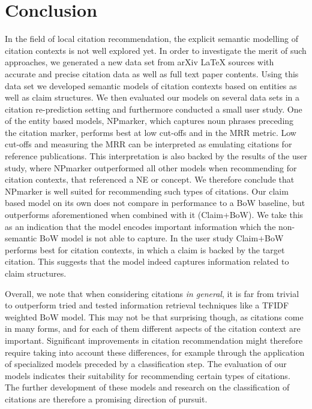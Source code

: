 \chapter{Conclusion}\label{chap:conclusion}
In the field of local citation recommendation, the explicit semantic modelling of citation contexts is not well explored yet. In order to investigate the merit of such approaches, we generated a new data set from arXiv \LaTeX{} sources with accurate and precise citation data as well as full text paper contents. Using this data set we developed semantic models of citation contexts based on entities as well as claim structures. We then evaluated our models on several data sets in a citation re-prediction setting and furthermore conducted a small user study. One of the entity based models, NPmarker, which captures noun phrases preceding the citation marker, performs best at low cut-offs and in the MRR metric. Low cut-offs and measuring the MRR can be interpreted as emulating citations for reference publications. This interpretation is also backed by the results of the user study, where NPmarker outperformed all other models when recommending for citation contexts, that referenced a NE or concept. We therefore conclude that NPmarker is well suited for recommending such types of citations. Our claim based model on its own does not compare in performance to a BoW baseline, but outperforms aforementioned when combined with it (Claim+BoW). We take this as an indication that the model encodes important information which the non-semantic BoW model is not able to capture. In the user study Claim+BoW performs best for citation contexts, in which a claim is backed by the target citation. This suggests that the model indeed captures information related to claim structures.

Overall, we note that when considering citations \emph{in general}, it is far from trivial to outperform tried and tested information retrieval techniques like a TFIDF weighted BoW model. This may not be that surprising though, as citations come in many forms, and for each of them different aspects of the citation context are important. Significant improvements in citation recommendation might therefore require taking into account these differences, for example through the application of specialized models preceded by a classification step. The evaluation of our models indicates their suitability for recommending certain types of citations. The further development of these models and research on the classification of citations are therefore a promising direction of pursuit.
